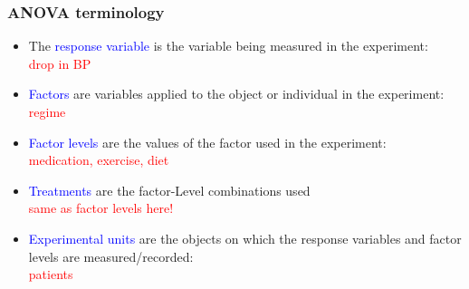 \documentclass[12pt,xcolor=dvipsnames,handout,mathserif,aspectratio=169]{beamer}
\newcommand{\tc}{\textcolor}
\begin{document}
\begin{frame}\frametitle{ANOVA terminology}
\begin{itemize}
\item The \tc{blue}{response variable} is the variable being measured in the experiment:\\
\hspace*{1.9cm}\tc{red}{drop in BP}
\vspace*{0.3cm}
\item \tc{blue}{Factors} are variables applied to the object or individual in the experiment:\\
\hspace*{1.9cm}\tc{red}{regime}
\vspace*{0.3cm}
\item \tc{blue}{Factor levels} are the values of the factor used in the experiment:\\
\hspace*{1.9cm}\tc{red}{medication, exercise, diet}
\vspace*{0.3cm}
\item \tc{blue}{Treatments} are the factor-Level combinations used\\
\hspace*{1.9cm}\tc{red}{same as factor levels here!}
\vspace*{0.3cm}
\item \tc{blue}{Experimental units} are the objects on which the response variables and factor levels
are measured/recorded:\\
\hspace*{1.9cm}\tc{red}{patients}
\end{itemize}
\end{frame}
\end{document}
